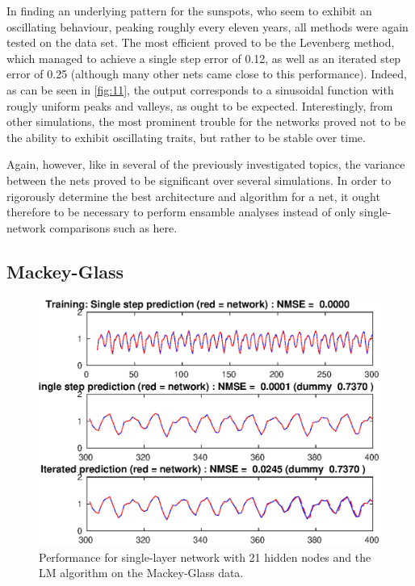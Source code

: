 \documentclass[a4paper,12pt]{article}
\theoremstyle{plain}
\theoremstyle{definition}
\begin{document}
      In finding an underlying pattern for the sunspots, who seem to exhibit an
      oscillating behaviour, peaking roughly every eleven years, all methods
      were again tested on the data set. The most efficient proved to be the
      Levenberg method, which managed to achieve a single step error of 0.12, as
      well as an iterated step error of 0.25 (although many other nets came
      close to this performance). Indeed, as can be seen in \cref{fig:11}, the
      output corresponds to a sinusoidal function with rougly uniform peaks
      and valleys, as ought to be expected. Interestingly, from other simulations, the most
      prominent trouble for the networks proved not to be the ability to exhibit
      oscillating traits, but rather to be stable over time. 

      Again, however, like in several of the previously investigated topics, the
      variance between the nets proved to be significant over several
      simulations. In order to rigorously determine the best architecture and
      algorithm for a net, it ought therefore to be necessary to perform
      ensamble analyses instead of only single-network comparisons such as
      here. 

   \subsection{Mackey-Glass}

      \begin{figure}[H]
         \centering
         \includegraphics[scale=.8]{12_21_nodes_levenberg}
         \caption{Performance for single-layer network with 21 hidden nodes and
         the LM algorithm on the Mackey-Glass data.}
         \label{fig:12}
      \end{figure}
      
\end{document}
